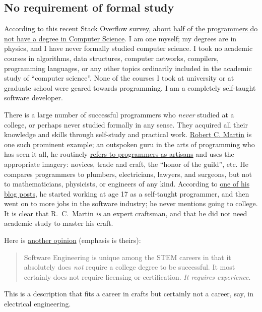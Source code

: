 \subsection{No requirement of formal study }

According to this recent Stack Overflow survey, \href{https://thenextweb.com/insider/2016/04/23/dont-need-go-college-anymore-programmer/}{about half of the programmers do not have a degree in Computer Science}.
I am one myself; my degrees are in physics, and I have never formally
studied computer science. I took no academic courses in algorithms,
data structures, computer networks, compilers, programming languages,
or any other topics ordinarily included in the academic study of ``computer
science''. None of the courses I took at university or at graduate
school were geared towards programming. I am a completely self-taught
software developer.

There is a large number of successful programmers who \emph{never}
studied at a college, or perhaps never studied formally in any sense.
They acquired all their knowledge and skills through self-study and
practical work. \href{https://en.wikipedia.org/wiki/Robert_C._Martin}{Robert C. Martin}
is one such prominent example; an outspoken guru in the arts of programming
who has seen it all, he routinely \href{https://blog.cleancoder.com/uncle-bob/2013/02/01/The-Humble-Craftsman.html}{refers to programmers as artisans}
and uses the appropriate imagery: novices, trade and craft, the ``honor
of the guild'', etc. He compares programmers to plumbers, electricians,
lawyers, and surgeons, but not to mathematicians, physicists, or engineers
of any kind. According to \href{https://blog.cleancoder.com/uncle-bob/2013/11/25/Novices-Coda.html}{one of his blog posts},
he started working at age 17 as a self-taught programmer, and then
went on to more jobs in the software industry; he never mentions going
to college. It is clear that R.~C.~Martin \emph{is} an expert craftsman,
and that he did not need academic study to master his craft.

Here is \href{https://www.quora.com/Can-you-become-a-software-engineer-without-actually-going-to-university-college-How}{another opinion}
(emphasis is theirs):
\begin{quotation}
Software Engineering is unique among the STEM careers in that it absolutely
does \emph{not} require a college degree to be successful. It most
certainly does not require licensing or certification. \emph{It requires
experience}.
\end{quotation}
This is a description that fits a career in crafts \textendash{} but
certainly not a career, say, in electrical engineering.

